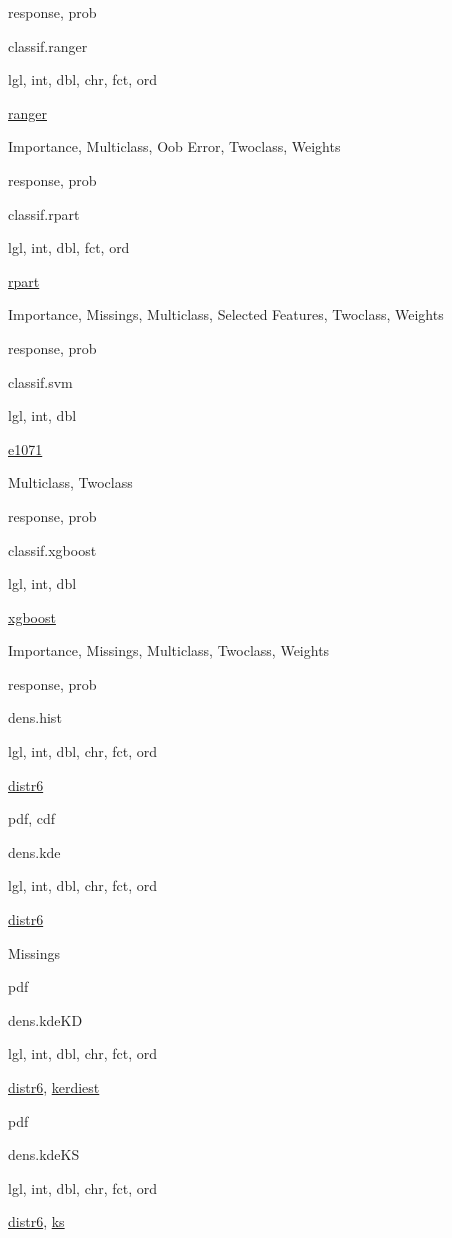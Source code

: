 \documentclass[]{article}
\begin{document}
response, prob

classif.ranger

lgl, int, dbl, chr, fct, ord

\href{https://cran.r-project.org/package=ranger}{ranger}

Importance, Multiclass, Oob Error, Twoclass, Weights

response, prob

classif.rpart

lgl, int, dbl, fct, ord

\href{https://cran.r-project.org/package=rpart}{rpart}

Importance, Missings, Multiclass, Selected Features, Twoclass, Weights

response, prob

classif.svm

lgl, int, dbl

\href{https://cran.r-project.org/package=e1071}{e1071}

Multiclass, Twoclass

response, prob

classif.xgboost

lgl, int, dbl

\href{https://cran.r-project.org/package=xgboost}{xgboost}

Importance, Missings, Multiclass, Twoclass, Weights

response, prob

dens.hist

lgl, int, dbl, chr, fct, ord

\href{https://cran.r-project.org/package=distr6}{distr6}

pdf, cdf

dens.kde

lgl, int, dbl, chr, fct, ord

\href{https://cran.r-project.org/package=distr6}{distr6}

Missings

pdf

dens.kdeKD

lgl, int, dbl, chr, fct, ord

\href{https://cran.r-project.org/package=distr6}{distr6}, \href{https://cran.r-project.org/package=kerdiest}{kerdiest}

pdf

dens.kdeKS

lgl, int, dbl, chr, fct, ord

\href{https://cran.r-project.org/package=distr6}{distr6}, \href{https://cran.r-project.org/package=ks}{ks}
\end{document}
